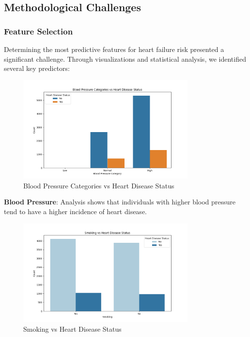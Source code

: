 \documentclass[11pt,a4paper]{article}
\begin{document}
\subsection{Methodological Challenges}

\subsubsection{Feature Selection}
\vspace{-0.25cm}
Determining the most predictive features for heart failure risk
presented a significant challenge. Through visualizations and statistical analysis, we identified several key predictors:

\begin{figure}[H]
    \centering
    \includegraphics[width=0.8\textwidth]{./pictures/blood_pressure_categories_vs_heart_disease_status.png}
    \caption{Blood Pressure Categories vs Heart Disease Status}
\end{figure}

\textbf{Blood Pressure}: Analysis shows that individuals with higher blood pressure tend to have a higher incidence of heart disease.

\begin{figure}[H]
    \centering
    \includegraphics[width=0.8\textwidth]{./pictures/smoking_vs_heart_disease_status.png}
    \caption{Smoking vs Heart Disease Status}
\end{figure}
\end{document}

